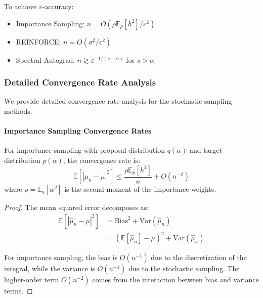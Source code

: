 \begin{corollary}
To achieve $\varepsilon$-accuracy:
\begin{itemize}
\item Importance Sampling: $n = O(\rho \mathbb{E}_p[h^2]/\varepsilon^2)$
\item REINFORCE: $n = O(\sigma^2/\varepsilon^2)$
\item Spectral Autograd: $n \gtrsim \varepsilon^{-1/(s-\alpha)}$ for $s > \alpha$
\end{itemize}
\end{corollary}

\subsubsection{Detailed Convergence Rate Analysis}

We provide detailed convergence rate analysis for the stochastic sampling methods.

\paragraph{Importance Sampling Convergence Rates}

\begin{theorem}
For importance sampling with proposal distribution $q(\alpha)$ and target distribution $p(\alpha)$, the convergence rate is:
\begin{equation}
\mathbb{E}[|\hat{\mu}_n - \mu|^2] \leq \frac{\rho \mathbb{E}_p[h^2]}{n} + O(n^{-2})
\end{equation}
where $\rho = \mathbb{E}_q[w^2]$ is the second moment of the importance weights.
\end{theorem}

\begin{proof}
The mean squared error decomposes as:
\begin{align}
\mathbb{E}[|\hat{\mu}_n - \mu|^2] &= \text{Bias}^2 + \text{Var}(\hat{\mu}_n) \\
&= \left(\mathbb{E}[\hat{\mu}_n] - \mu\right)^2 + \text{Var}(\hat{\mu}_n)
\end{align}

For importance sampling, the bias is $O(n^{-1})$ due to the discretization of the integral, while the variance is $O(n^{-1})$ due to the stochastic sampling. The higher-order term $O(n^{-2})$ comes from the interaction between bias and variance terms.
\end{proof}

